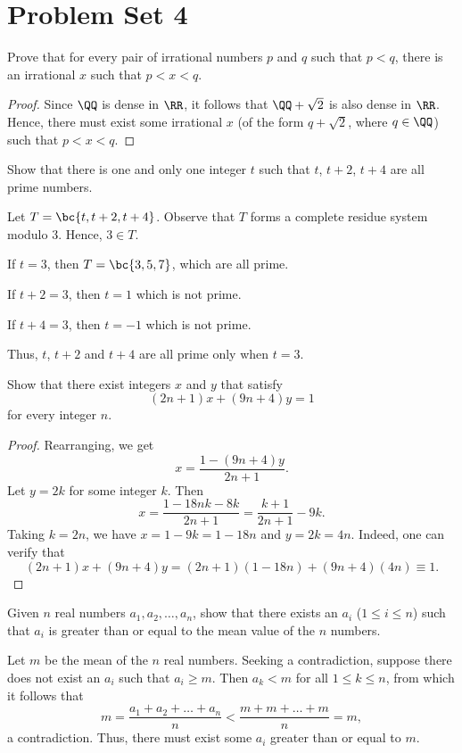 \section{Problem Set 4}

\begin{problem}
    Prove that for every pair of irrational numbers $p$ and $q$ such that $p < q$, there is an irrational $x$ such that $p < x < q$.
\end{problem}
\begin{proof}
    Since $\QQ$ is dense in $\RR$, it follows that $\QQ + \sqrt2$ is also dense in $\RR$. Hence, there must exist some irrational $x$ (of the form $q + \sqrt2$, where $q \in \QQ$) such that $p < x < q$.
\end{proof}

\begin{problem}
    Show that there is one and only one integer $t$ such that $t$, $t+2$, $t+4$ are all prime numbers.
\end{problem}
\begin{solution}
    Let $T = \bc{t, t+2, t+4}$. Observe that $T$ forms a complete residue system modulo 3. Hence, $3 \in T$.

     If $t = 3$, then $T = \bc{3, 5, 7}$, which are all prime.

     If $t + 2 = 3$, then $t = 1$ which is not prime.

     If $t + 4 = 3$, then $t = -1$ which is not prime.

    Thus, $t$, $t+2$ and $t+4$ are all prime only when $t = 3$.
\end{solution}

\begin{problem}
    Show that there exist integers $x$ and $y$ that satisfy \[(2n + 1) x + (9n + 4)y = 1\] for every integer $n$.
\end{problem}
\begin{proof}
    Rearranging, we get \[x = \frac{1 - (9n+4)y}{2n+1}.\] Let $y = 2k$ for some integer $k$. Then \[x = \frac{1 - 18nk - 8k}{2n+1} = \frac{k + 1}{2n+1} - 9k.\] Taking $k = 2n$, we have $x = 1 - 9k = 1-18n$ and $y = 2k = 4n$. Indeed, one can verify that \[(2n+1)x + (9n+4)y = (2n+1)(1-18n) + (9n+4)(4n) \equiv 1.\]
\end{proof}

\begin{problem}
    Given $n$ real numbers $a_1, a_2, \dots, a_n$, show that there exists an $a_i$ ($1 \leq i \leq n$) such that $a_i$ is greater than or equal to the mean value of the $n$ numbers.
\end{problem}
\begin{solution}
    Let $m$ be the mean of the $n$ real numbers. Seeking a contradiction, suppose there does not exist an $a_i$ such that $a_i \geq m$. Then $a_k < m$ for all $1 \leq k \leq n$, from which it follows that \[m = \frac{a_1 + a_2 + \dots + a_n}{n} < \frac{m + m + \dots + m}{n} = m,\] a contradiction. Thus, there must exist some $a_i$ greater than or equal to $m$.
\end{solution}

